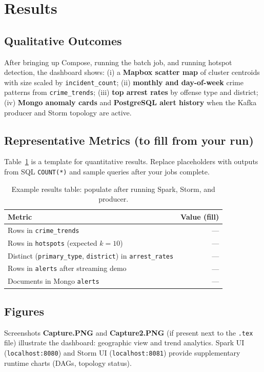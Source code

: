 \documentclass[12pt,a4paper]{article}
\begin{document}
\section{Results}
\label{sec:results}

\subsection{Qualitative Outcomes}
After bringing up Compose, running the batch job, and running hotspot detection, the dashboard shows: (i) a \textbf{Mapbox scatter map} of cluster centroids with size scaled by \texttt{incident\_count}; (ii) \textbf{monthly and day-of-week} crime patterns from \texttt{crime\_trends}; (iii) \textbf{top arrest rates} by offense type and district; (iv) \textbf{Mongo anomaly cards} and \textbf{PostgreSQL alert history} when the Kafka producer and Storm topology are active.

\subsection{Representative Metrics (to fill from your run)}
Table~\ref{tab:metrics} is a template for quantitative results. Replace placeholders with outputs from SQL \texttt{COUNT(*)} and sample queries after your jobs complete.

\begin{table}[ht]
\centering
\small
\begin{tabular}{@{}lr@{}}
\toprule
\textbf{Metric} & \textbf{Value (fill)} \\
\midrule
Rows in \texttt{crime\_trends} & --- \\
Rows in \texttt{hotspots} (expected $k{=}10$) & --- \\
Distinct (\texttt{primary\_type}, \texttt{district}) in \texttt{arrest\_rates} & --- \\
Rows in \texttt{alerts} after streaming demo & --- \\
Documents in Mongo \texttt{alerts} & --- \\
\bottomrule
\end{tabular}
\caption{Example results table: populate after running Spark, Storm, and producer.}
\label{tab:metrics}
\end{table}

\subsection{Figures}
Screenshots \textbf{Capture.PNG} and \textbf{Capture2.PNG} (if present next to the \texttt{.tex} file) illustrate the dashboard: geographic view and trend analytics. Spark UI (\texttt{localhost:8080}) and Storm UI (\texttt{localhost:8081}) provide supplementary runtime charts (DAGs, topology status).
\end{document}
